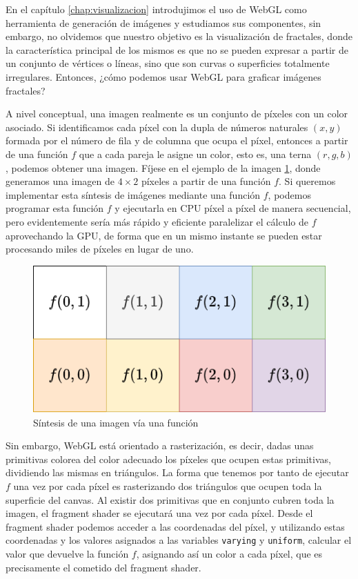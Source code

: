 %
%

En el capítulo \ref{chap:visualizacion} introdujimos el uso de WebGL como herramienta de generación de imágenes y estudiamos sus componentes, sin embargo, no olvidemos que nuestro objetivo es la visualización de fractales, donde la característica principal de los mismos es que no se pueden expresar a partir de un conjunto de vértices o líneas, sino que son curvas o superficies totalmente irregulares. Entonces, ¿cómo podemos usar WebGL para graficar imágenes fractales?

A nivel conceptual, una imagen realmente es un conjunto de píxeles con un color asociado. Si identificamos cada píxel con la dupla de números naturales $(x,y)$ formada por el número de fila y de columna que ocupa el píxel, entonces a partir de una función $f$ que a cada pareja le asigne un color, esto es, una terna $(r,g,b)$, podemos obtener una imagen. Fíjese en el ejemplo de la imagen \ref{fig:sintesis-imagenes-f}, donde generamos una imagen de $4\times 2$ píxeles a partir de una función $f$. Si queremos implementar esta síntesis de imágenes mediante una función $f$, podemos programar esta función $f$ y ejecutarla en CPU píxel a píxel de manera secuencial, pero evidentemente sería más rápido y eficiente paralelizar el cálculo de $f$ aprovechando la GPU, de forma que en un mismo instante se pueden estar procesando miles de píxeles en lugar de uno. 

\begin{figure} [ht]
    \centering
    \includegraphics[scale = 0.4]{img/C7/sintesis-imagenes-f.png}
    \caption{Síntesis de una imagen vía una función}
    \label{fig:sintesis-imagenes-f}
\end{figure}


Sin embargo, WebGL está orientado a rasterización, es decir, dadas unas primitivas colorea del color adecuado los píxeles que ocupen estas primitivas, dividiendo las mismas en triángulos. La forma que tenemos por tanto de ejecutar $f$ una vez por cada píxel es rasterizando dos triángulos que ocupen toda la superficie del canvas. Al existir dos primitivas que en conjunto cubren toda la imagen, el fragment shader se ejecutará una vez por cada píxel. Desde el fragment shader podemos acceder a las coordenadas del píxel, y utilizando estas coordenadas y los valores asignados a las variables \verb|varying| y \verb|uniform|, calcular el valor que devuelve la función $f$, asignando así un color a cada píxel, que es precisamente el cometido del fragment shader.

